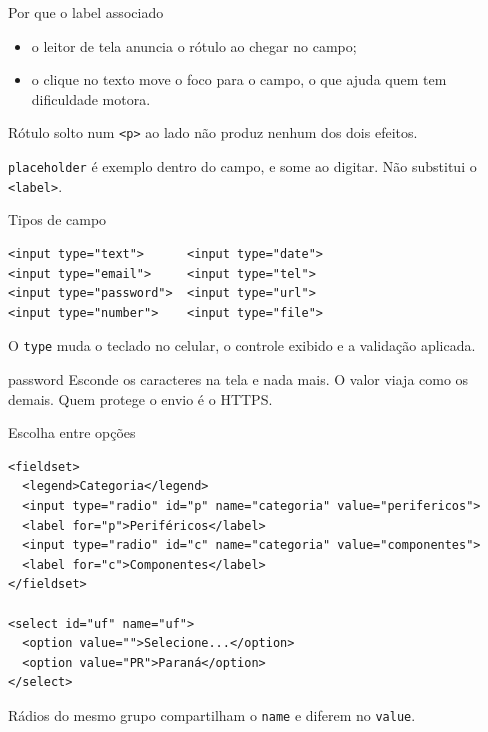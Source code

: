 \documentclass{beamer}
\begin{document}
\begin{frame}{Por que o label associado}
  \begin{itemize}
    \item o leitor de tela anuncia o rótulo ao chegar no campo;
    \item o clique no texto move o foco para o campo, o que ajuda quem tem
          dificuldade motora.
  \end{itemize}

  \vspace{0.5cm}
  Rótulo solto num \texttt{<p>} ao lado não produz nenhum dos dois efeitos.

  \vspace{0.5cm}
  \texttt{placeholder} é exemplo dentro do campo, e some ao digitar. Não
  substitui o \texttt{<label>}.
\end{frame}

\begin{frame}[fragile]{Tipos de campo}
  \begin{verbatim}
<input type="text">      <input type="date">
<input type="email">     <input type="tel">
<input type="password">  <input type="url">
<input type="number">    <input type="file">
  \end{verbatim}

  \vspace{0.3cm}
  O \texttt{type} muda o teclado no celular, o controle exibido e a validação
  aplicada.

  \begin{alertblock}{password}
    Esconde os caracteres na tela e nada mais. O valor viaja como os demais. Quem
    protege o envio é o HTTPS.
  \end{alertblock}
\end{frame}

\begin{frame}[fragile]{Escolha entre opções}
  \begin{verbatim}
<fieldset>
  <legend>Categoria</legend>
  <input type="radio" id="p" name="categoria" value="perifericos">
  <label for="p">Periféricos</label>
  <input type="radio" id="c" name="categoria" value="componentes">
  <label for="c">Componentes</label>
</fieldset>

<select id="uf" name="uf">
  <option value="">Selecione...</option>
  <option value="PR">Paraná</option>
</select>
  \end{verbatim}

  \vspace{0.2cm}
  \small Rádios do mesmo grupo compartilham o \texttt{name} e diferem no
  \texttt{value}.
\end{frame}
\end{document}
